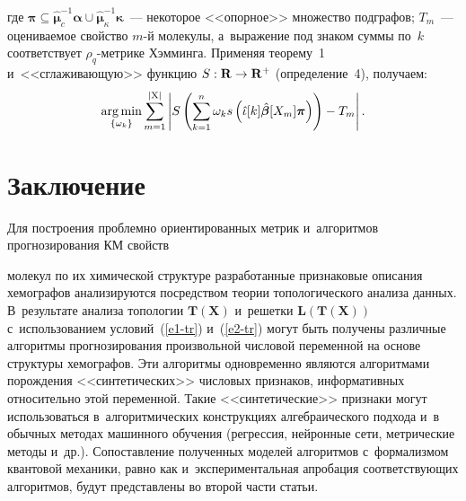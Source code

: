 \begin{multicols}{2}
\vspace*{-12pt}

\noindent
где $\boldsymbol{\pi} \subseteq \hat{\boldsymbol{\mu}}_c^{-1}\boldsymbol{\alpha}
\cup \hat{\boldsymbol{\mu}}_\kappa^{-1}{\boldsymbol{\kappa}}$~--- 
некоторое <<опорное>> множество подграфов; $T_m$~--- оцениваемое 
свойство \mbox{$m$-й} молекулы, а~выражение под знаком суммы по~$k$ 
соответствует $\rho_q$-мет\-ри\-ке Хэмминга. Применяя теорему~1 
и~<<сглаживающую>> функцию $S: \mathbf{R}\hm\to 
\mathbf{R}^+$ (определение~4), получаем:
\begin{equation*}
\mathop{\mathrm{arg}\,\mathrm{min}}\limits_{\{\omega_k\}} \sum\limits_{m=1}^{\vert\mathrm{X}\vert} 
\left\vert S\left( \sum\limits^n_{k=1} \omega_k 
s\left(\hat{\iota}[k]\hat{\boldsymbol{\beta}}[X_m]\boldsymbol{\pi}\right)\right)-T_m\right\vert.
\end{equation*}

\vspace*{-18pt}

\section{Заключение}

\vspace*{-2pt}

     Для построения проблемно ориентированных метрик и~алгоритмов 
прогнозирования  КМ свойств\linebreak\vspace*{-12pt}

\pagebreak

\noindent
 молекул по их 
химической структуре разработанные признаковые описания хемографов 
анализируются посредством теории топологического анализа данных. 
В~результате анализа топологии $\mathbf{T}(\mathbf{X})$ и~решетки 
$\mathbf{L}(\mathbf{T}(\mathbf{X}))$ с~использованием условий~(\ref{e1-tr}) 
и~(\ref{e2-tr}) могут быть получены различные алгоритмы прог\-но\-зи\-ро\-вания 
произвольной числовой переменной на основе структуры хемографов. Эти 
алгоритмы одновременно являются алгоритмами порождения 
<<синтетических>> числовых признаков, информативных относительно этой 
переменной. Такие <<синтетические>> признаки могут использоваться 
в~алгоритмических конструкциях алгебраического подхода и~в обычных 
методах машинного обучения (регрессия, нейронные сети, метрические методы 
и~др.). Сопоставление полученных моделей алгоритмов с~формализмом 
квантовой механики, равно как и~экспериментальная апробация 
соответствующих алгоритмов, будут представлены во второй части статьи.


\end{multicols}
